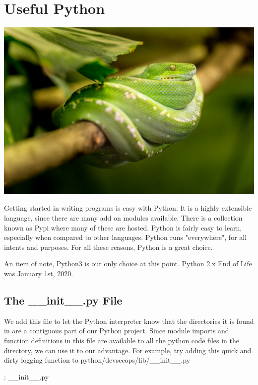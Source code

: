 \chapter{Useful Python}

\includegraphics[scale=0.85]{../images/snake-1634293_1920.jpg}

\justify
Getting started in writing programs is easy with Python. It is a highly 
extensible language, since there are many add on modules available. 
There is a collection known as Pypi where many of these are hosted.
Python is fairly easy to learn, especially when compared to other languages.
Python runs "everywhere", for all intents and purposes. For all these reasons,
Python is a great choice.

\justify
An item of note, Python3 is our only choice at this point. Python 2.x End of Life was
January 1st, 2020.

\section{The \_\_init\_\_.py File}

\justify
We add this file to let the Python interpreter know that the directories
it is found in are a contiguous part of our Python project. Since module
imports and function definitions in this file are available to all the
python code files in the directory, we can use it to our advantage. For
example, try adding this quick and dirty logging function to
python/devsecops/lib/\_\_init\_\_.py

\justify
\begin{mybox}{\thetcbcounter: \_\_init\_\_.py}
  
\end{mybox}

